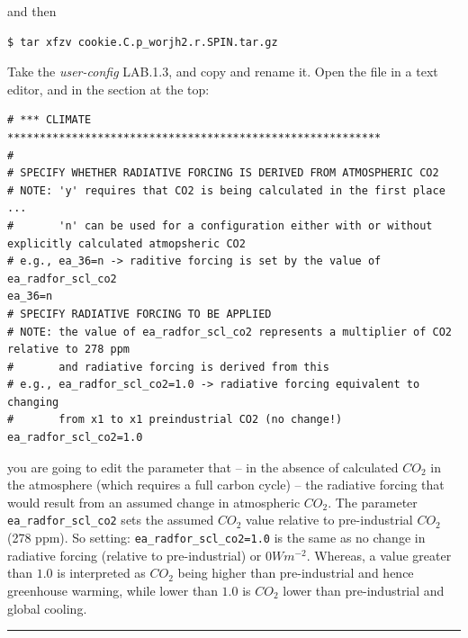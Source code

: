 \noindent and then

\vspace{-2mm}\small\begin{verbatim}
$ tar xfzv cookie.C.p_worjh2.r.SPIN.tar.gz
\end{verbatim}\normalsize\vspace{-2mm}

\noindent Take the \textit{user-config} \textsf{\footnotesize LAB.1.3}, and copy and rename it. Open the file in a text editor, and in the section at the top:

\vspace{-1mm}\footnotesize\begin{verbatim}
# *** CLIMATE **********************************************************
#
# SPECIFY WHETHER RADIATIVE FORCING IS DERIVED FROM ATMOSPHERIC CO2	
# NOTE: 'y' requires that CO2 is being calculated in the first place ...
#       'n' can be used for a configuration either with or without explicitly calculated atmopsheric CO2
# e.g., ea_36=n -> raditive forcing is set by the value of ea_radfor_scl_co2
ea_36=n
# SPECIFY RADIATIVE FORCING TO BE APPLIED
# NOTE: the value of ea_radfor_scl_co2 represents a multiplier of CO2 relative to 278 ppm 
#       and radiative forcing is derived from this
# e.g., ea_radfor_scl_co2=1.0 -> radiative forcing equivalent to changing 
#       from x1 to x1 preindustrial CO2 (no change!)
ea_radfor_scl_co2=1.0
\end{verbatim}\normalsize\vspace{-1mm}

\noindent you are going to edit the parameter that -- in the absence of calculated $CO_2$ in the atmosphere (which requires a full carbon cycle) -- the radiative forcing that would result from an assumed change in atmospheric $CO_2$. The parameter \texttt{ea\_radfor\_scl\_co2} sets the assumed $CO_2$ value relative to pre-industrial $CO_2$ (278 ppm). So setting: \texttt{\small ea\_radfor\_scl\_co2=1.0} is the same as no change in radiative forcing (relative to pre-industrial) or $0 Wm^{-2}$. Whereas, a value greater than $1.0$ is interpreted as $CO_2$ being higher than pre-industrial and hence greenhouse warming, while lower than $1.0$ is $CO_2$ lower than pre-industrial and global cooling.

\vspace{1mm}\noindent\rule{4cm}{0.5pt}\vspace{2mm}

